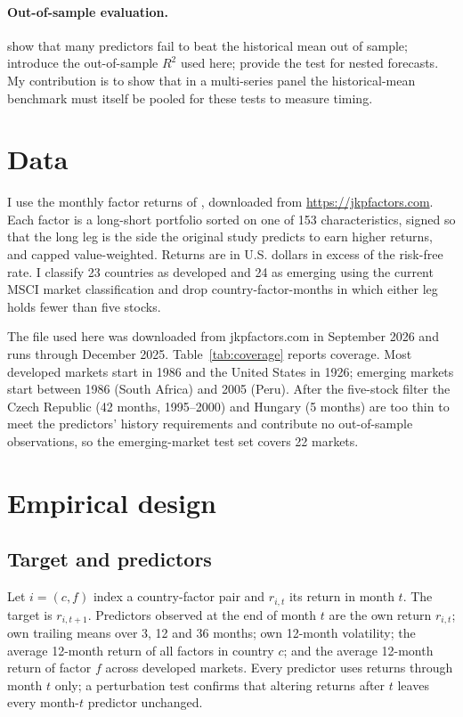 \documentclass[11pt]{article}
\begin{document}
\paragraph{Out-of-sample evaluation.} \citet{welch2008comprehensive} show that many predictors fail to beat the historical mean out of sample; \citet{campbell2008predicting} introduce the out-of-sample $R^2$ used here; \citet{clark2007approximately} provide the test for nested forecasts. My contribution is to show that in a multi-series panel the historical-mean benchmark must itself be pooled for these tests to measure timing.

\section{Data}

I use the monthly factor returns of \citet{jensen2023replication}, downloaded from \url{https://jkpfactors.com}. Each factor is a long-short portfolio sorted on one of 153 characteristics, signed so that the long leg is the side the original study predicts to earn higher returns, and capped value-weighted. Returns are in U.S. dollars in excess of the risk-free rate. I classify 23 countries as developed and 24 as emerging using the current MSCI market classification and drop country-factor-months in which either leg holds fewer than five stocks.

The file used here was downloaded from jkpfactors.com in September 2026 and runs through December 2025. Table~\ref{tab:coverage} reports coverage. Most developed markets start in 1986 and the United States in 1926; emerging markets start between 1986 (South Africa) and 2005 (Peru). After the five-stock filter the Czech Republic (42 months, 1995--2000) and Hungary (5 months) are too thin to meet the predictors' history requirements and contribute no out-of-sample observations, so the emerging-market test set covers 22 markets.



\section{Empirical design}

\subsection{Target and predictors}
Let $i=(c,f)$ index a country-factor pair and $r_{i,t}$ its return in month $t$. The target is $r_{i,t+1}$. Predictors observed at the end of month $t$ are the own return $r_{i,t}$; own trailing means over 3, 12 and 36 months; own 12-month volatility; the average 12-month return of all factors in country $c$; and the average 12-month return of factor $f$ across developed markets. Every predictor uses returns through month $t$ only; a perturbation test confirms that altering returns after $t$ leaves every month-$t$ predictor unchanged.
\end{document}
